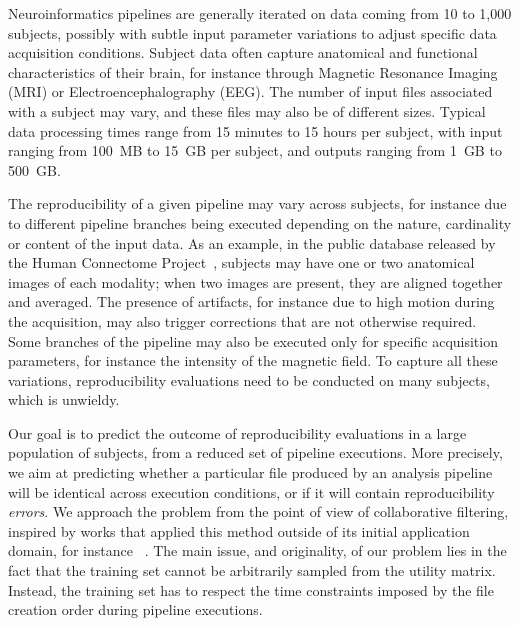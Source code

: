 \documentclass[10pt, conference, compsocconf]{IEEEtran}
\begin{document}
Neuroinformatics pipelines are generally iterated on data coming from 10 to 
1,000 subjects, possibly with subtle input parameter variations to 
adjust specific data acquisition conditions. Subject data often capture 
anatomical and functional characteristics of their brain, for instance through
Magnetic Resonance Imaging (MRI) or Electroencephalography (EEG). The number of input files 
associated with a subject may vary, and these files may also be of 
different sizes. Typical data processing times range from 15 minutes to 
15 hours per subject, with input ranging from 100~MB to 15~GB per subject, and 
outputs ranging from 1~GB to 500~GB.

The reproducibility of a given pipeline may vary across subjects, for 
instance due to different pipeline branches being executed depending on 
the nature, cardinality or content of the input data. As an example, in 
the public database released by the Human Connectome 
Project~\cite{van2013wu}, subjects may have one or two anatomical images of 
each modality; when two images are 
present, they are aligned together and averaged. The presence of 
artifacts, for instance due to high motion during the acquisition, may 
also trigger corrections that are not otherwise required. Some branches 
of the pipeline may also be executed only for specific acquisition 
parameters, for instance the intensity of the magnetic field. To 
capture all these variations, reproducibility evaluations need to be 
conducted on many subjects, which is unwieldy. 

Our goal is to predict the outcome of reproducibility evaluations in a 
large population of subjects, from a reduced set of pipeline 
executions. More precisely, we aim at predicting whether a particular 
file produced by an analysis pipeline will be identical across 
execution conditions, or if it will contain reproducibility 
\emph{errors}. We approach the problem from the point of view of 
collaborative filtering, inspired by works that applied 
this method outside of its initial application domain, for instance 
~\cite{feng2013efficient}. The main issue, and originality, of our 
problem lies in the fact that the training set cannot be arbitrarily 
sampled from the utility matrix. Instead, the training set has to 
respect the time constraints imposed by the file creation order during 
pipeline executions.
\end{document}
